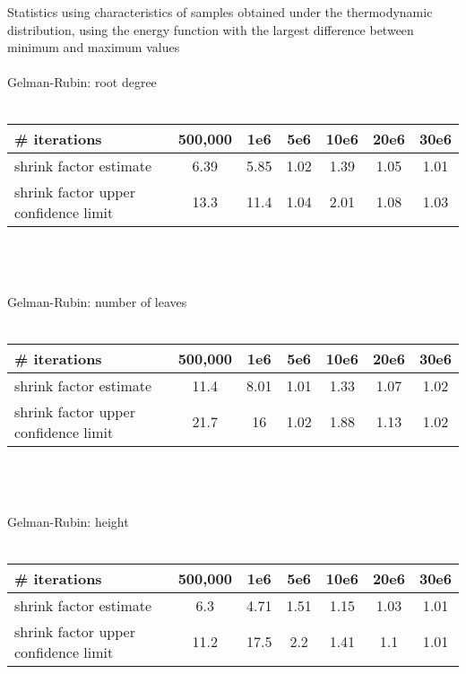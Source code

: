 \documentclass{article}
\begin{document}
{\Large Statistics using characteristics of samples obtained under the thermodynamic distribution, using the energy function with the largest difference between minimum and maximum values} \\ \\

{\Large Gelman-Rubin: root degree}	\\
\\
\begin{tabular}{| l | c | c |c | c | c | c |}
	\hline
	\# iterations&500,000&1e6&5e6&10e6&20e6&30e6 \\ \hline
	shrink factor estimate&6.39&5.85&1.02&1.39&1.05&1.01 \\
	shrink factor upper confidence limit&13.3&11.4&1.04&2.01&1.08&1.03 \\
	\hline
\end{tabular}
\\
\\
\\

{\Large Gelman-Rubin: number of leaves} \\
\\
\begin{tabular}{| l | c | c |c | c | c | c |}	
	\hline
	\# iterations&500,000&1e6&5e6&10e6&20e6&30e6 \\ \hline
	shrink factor estimate&11.4&8.01&1.01&1.33&1.07&1.02 \\
	shrink factor upper confidence limit&21.7&16&1.02&1.88&1.13&1.02 \\
	\hline
\end{tabular}
\\
\\
\\

{\Large Gelman-Rubin: height}	\\
\\
\begin{tabular}{| l | c | c |c | c | c | c |}
	\hline
	\# iterations&500,000&1e6&5e6&10e6&20e6&30e6 \\ \hline
	shrink factor estimate&6.3&4.71&1.51&1.15&1.03&1.01 \\
	shrink factor upper confidence limit&11.2&17.5&2.2&1.41&1.1&1.01 \\
	\hline
\end{tabular}
\\
\\
\\
\end{document}
